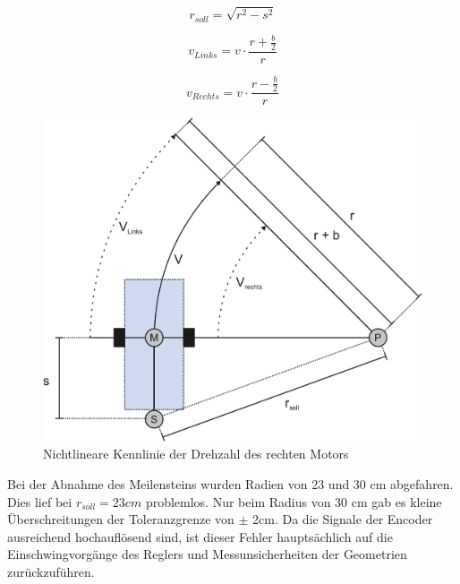 \documentclass[12pt,a4paper,oneside]{article}
\begin{document}
\begin{spacing}{1.15}
\begin{center}
	\begin{equation}
		r_{soll} = \sqrt{r^2-s^2}
	\label{eq:kreisfahrt1}
	\end{equation}
\end{center} 

\begin{center}
	\begin{equation}
	v_{Links} = v \cdot \frac{r + \frac{b}{2}}{r}
	\label{eq:kreisfahrt2}
	\end{equation}
\end{center} 

\begin{center}
	\begin{equation}
	v_{Rechts} = v \cdot \frac{r - \frac{b}{2}}{r}
	\label{eq:kreisfahrt3}
	\end{equation}
\end{center}


\begin{figure}[!htb]
	\centering
	\includegraphics[scale=.4]{figs/Kreisfahrt}
	\caption{Nichtlineare Kennlinie der Drehzahl des rechten Motors}
	\label{fig:kreisfahrt}
\end{figure}


\newpage
Bei der Abnahme des Meilensteins wurden Radien von 23 und 30 cm abgefahren. Dies lief bei $r_{soll} = 23 cm$ problemlos. Nur beim Radius von 30 cm gab es kleine Überschreitungen der Toleranzgrenze von $\pm$ 2cm. Da die Signale der Encoder ausreichend hochauflösend sind, ist dieser Fehler hauptsächlich auf die Einschwingvorgänge des Reglers und Messunsicherheiten der Geometrien zurückzuführen. 


\end{spacing}
\end{document}
